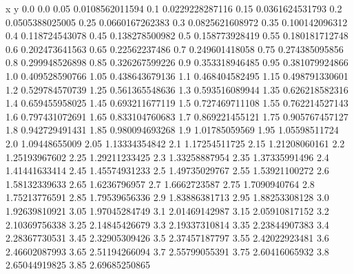               x                y
            0.0              0.0
           0.05  0.0108562011594
            0.1  0.0229228287116
           0.15  0.0361624531793
            0.2  0.0505388025005
           0.25  0.0660167262383
            0.3  0.0825621608972
           0.35   0.100142096312
            0.4   0.118724543078
           0.45   0.138278500982
            0.5   0.158773928419
           0.55   0.180181712748
            0.6   0.202473641563
           0.65    0.22562237486
            0.7   0.249601418058
           0.75   0.274385095856
            0.8   0.299948526898
           0.85   0.326267599226
            0.9   0.353318946485
           0.95   0.381079924866
            1.0   0.409528590766
           1.05   0.438643679136
            1.1   0.468404582495
           1.15   0.498791330601
            1.2   0.529784570739
           1.25   0.561365548636
            1.3   0.593516089944
           1.35   0.626218582316
            1.4   0.659455958025
           1.45   0.693211677119
            1.5   0.727469711108
           1.55   0.762214527143
            1.6   0.797431072691
           1.65   0.833104760683
            1.7   0.869221455121
           1.75   0.905767457127
            1.8   0.942729491431
           1.85   0.980094693268
            1.9    1.01785059569
           1.95    1.05598511724
            2.0    1.09448655009
           2.05    1.13334354842
            2.1    1.17254511725
           2.15    1.21208060161
            2.2    1.25193967602
           2.25    1.29211233425
            2.3    1.33258887954
           2.35    1.37335991496
            2.4    1.41441633414
           2.45    1.45574931233
            2.5    1.49735029767
           2.55    1.53921100272
            2.6    1.58132339633
           2.65     1.6236796957
            2.7     1.6662723587
           2.75     1.7090940764
            2.8    1.75213776591
           2.85    1.79539656336
            2.9    1.83886381713
           2.95    1.88253308128
            3.0    1.92639810921
           3.05    1.97045284749
            3.1    2.01469142987
           3.15    2.05910817152
            3.2    2.10369756338
           3.25    2.14845426679
            3.3    2.19337310814
           3.35    2.23844907383
            3.4    2.28367730531
           3.45    2.32905309426
            3.5    2.37457187797
           3.55    2.42022923481
            3.6    2.46602087993
           3.65    2.51194266094
            3.7    2.55799055391
           3.75    2.60416065932
            3.8    2.65044919825
           3.85    2.69685250865

